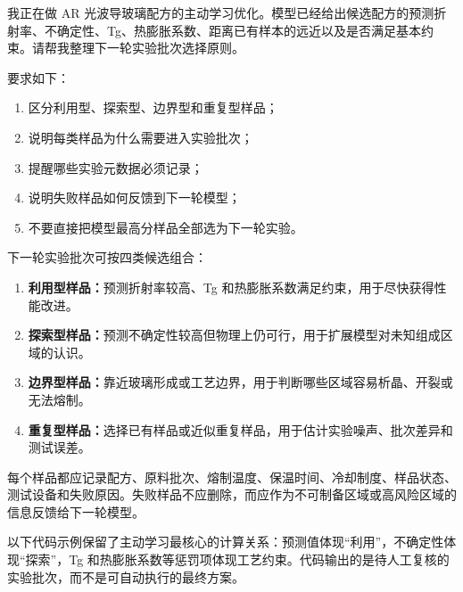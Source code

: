 \begin{samepage}
\begin{userbox}
我正在做 AR 光波导玻璃配方的主动学习优化。模型已经给出候选配方的预测折射率、不确定性、Tg、热膨胀系数、距离已有样本的远近以及是否满足基本约束。请帮我整理下一轮实验批次选择原则。

要求如下：
\begin{enumerate}
\item 区分利用型、探索型、边界型和重复型样品；
\item 说明每类样品为什么需要进入实验批次；
\item 提醒哪些实验元数据必须记录；
\item 说明失败样品如何反馈到下一轮模型；
\item 不要直接把模型最高分样品全部选为下一轮实验。
\end{enumerate}
\end{userbox}

\begin{aibox}
下一轮实验批次可按四类候选组合：

\begin{enumerate}
\item \textbf{利用型样品：}预测折射率较高、Tg 和热膨胀系数满足约束，用于尽快获得性能改进。
\item \textbf{探索型样品：}预测不确定性较高但物理上仍可行，用于扩展模型对未知组成区域的认识。
\item \textbf{边界型样品：}靠近玻璃形成或工艺边界，用于判断哪些区域容易析晶、开裂或无法熔制。
\item \textbf{重复型样品：}选择已有样品或近似重复样品，用于估计实验噪声、批次差异和测试误差。
\end{enumerate}

每个样品都应记录配方、原料批次、熔制温度、保温时间、冷却制度、样品状态、测试设备和失败原因。失败样品不应删除，而应作为不可制备区域或高风险区域的信息反馈给下一轮模型。
\end{aibox}
\end{samepage}

以下代码示例保留了主动学习最核心的计算关系：预测值体现“利用”，不确定性体现“探索”，Tg 和热膨胀系数等惩罚项体现工艺约束。代码输出的是待人工复核的实验批次，而不是可自动执行的最终方案。


